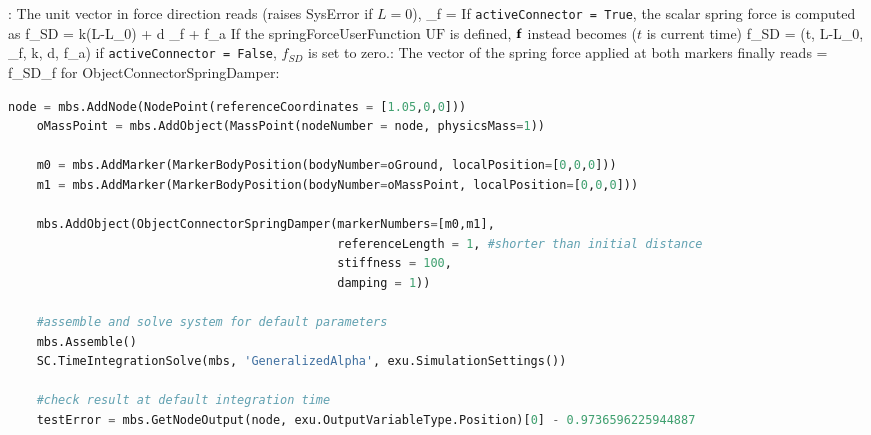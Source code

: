     :
    The unit vector in force direction reads (raises SysError if $L=0$),
    \be
      \vv_{f} =  \Delta\! 
    \ee
    If \texttt{activeConnector = True}, the scalar spring force is computed as
    \be
      f_{SD} = k\cdot(L-L_0) + d \cdot\Delta\! \tp \vv_{f} + f_{a}
    \ee
    If the springForceUserFunction $\mathrm{UF}$ is defined, $\mathbf{f}$ instead becomes ($t$ is current time)
    \be
      f_{SD} = (t, L-L_0, \Delta\! \tp \vv_{f}, k, d, f_{a})
    \ee
    if \texttt{activeConnector = False}, $f_{SD}$ is set to zero.:
    The vector of the spring force applied at both markers finally reads
    \be
      \fv = f_{SD}\vv_{f}
    \ee
{} for ObjectConnectorSpringDamper:
\pythonstyle
\begin{lstlisting}[language=Python, firstnumber=1]
    node = mbs.AddNode(NodePoint(referenceCoordinates = [1.05,0,0]))
    oMassPoint = mbs.AddObject(MassPoint(nodeNumber = node, physicsMass=1))
    
    m0 = mbs.AddMarker(MarkerBodyPosition(bodyNumber=oGround, localPosition=[0,0,0]))
    m1 = mbs.AddMarker(MarkerBodyPosition(bodyNumber=oMassPoint, localPosition=[0,0,0]))
    
    mbs.AddObject(ObjectConnectorSpringDamper(markerNumbers=[m0,m1],
                                              referenceLength = 1, #shorter than initial distance
                                              stiffness = 100,
                                              damping = 1))

    #assemble and solve system for default parameters
    mbs.Assemble()
    SC.TimeIntegrationSolve(mbs, 'GeneralizedAlpha', exu.SimulationSettings())

    #check result at default integration time
    testError = mbs.GetNodeOutput(node, exu.OutputVariableType.Position)[0] - 0.9736596225944887

\end{lstlisting}

\newpage

